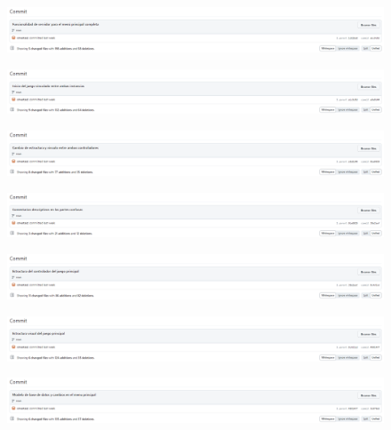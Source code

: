 \documentclass{article}
\begin{document}
\begin{figure}[H]
	\centering
	\includegraphics[width=1\textwidth,keepaspectratio]{img/commit_07.png}
\end{figure}
\begin{figure}[H]
	\centering
	\includegraphics[width=1\textwidth,keepaspectratio]{img/commit_08.png}
\end{figure}
\begin{figure}[H]
	\centering
	\includegraphics[width=1\textwidth,keepaspectratio]{img/commit_09.png}
\end{figure}
\begin{figure}[H]
	\centering
	\includegraphics[width=1\textwidth,keepaspectratio]{img/commit_10.png}
\end{figure}
\begin{figure}[H]
	\centering
	\includegraphics[width=1\textwidth,keepaspectratio]{img/commit_11.png}
\end{figure}
\begin{figure}[H]
	\centering
	\includegraphics[width=1\textwidth,keepaspectratio]{img/commit_12.png}
\end{figure}
\begin{figure}[H]
	\centering
	\includegraphics[width=1\textwidth,keepaspectratio]{img/commit_13.png}
\end{figure}
\end{document}
